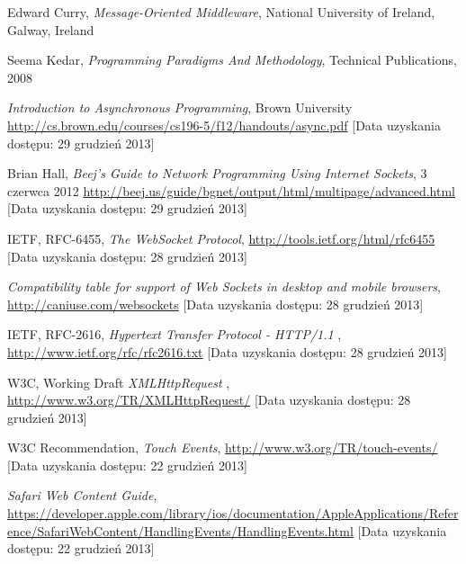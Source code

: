 \newpage

\begin{thebibliography}{1}
  
  
   Edward Curry, \emph{Message-Oriented Middleware}, National University of Ireland, Galway, Ireland

   Seema Kedar, \emph{Programming Paradigms And Methodology}, Technical Publications, 2008

   \emph{Introduction to Asynchronous Programming}, Brown University \url{http://cs.brown.edu/courses/cs196-5/f12/handouts/async.pdf} [Data uzyskania dostępu: 29 grudzień 2013]

   Brian Hall, \emph{Beej's Guide to Network Programming Using Internet Sockets}, 3 czerwca 2012 \url{http://beej.us/guide/bgnet/output/html/multipage/advanced.html} [Data uzyskania dostępu: 29 grudzień 2013]

   IETF, RFC-6455, \emph{The WebSocket Protocol}, \url{http://tools.ietf.org/html/rfc6455} [Data uzyskania dostępu: 28 grudzień 2013]

   \emph{Compatibility table for support of Web Sockets in desktop and mobile browsers}, \url{http://caniuse.com/websockets} [Data uzyskania dostępu: 28 grudzień 2013]

   IETF, RFC-2616, \emph{Hypertext Transfer Protocol - HTTP/1.1} , \url{http://www.ietf.org/rfc/rfc2616.txt} [Data uzyskania dostępu: 28 grudzień 2013]

   W3C, Working Draft \emph{XMLHttpRequest} , \url{http://www.w3.org/TR/XMLHttpRequest/} [Data uzyskania dostępu: 28 grudzień 2013]

   W3C Recommendation, {\em Touch Events}, \url{http://www.w3.org/TR/touch-events/} [Data uzyskania dostępu: 22 grudzień 2013]
  
   {\em Safari Web Content Guide}, \url{https://developer.apple.com/library/ios/documentation/AppleApplications/Reference/SafariWebContent/HandlingEvents/HandlingEvents.html} [Data uzyskania dostępu: 22 grudzień 2013]
  

\end{thebibliography}
